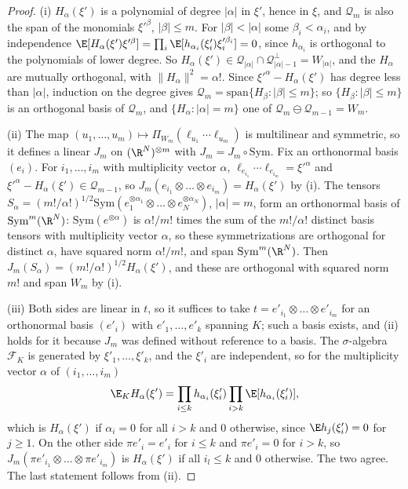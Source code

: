\begin{proof}
(i) $H_\alpha(\xi')$ is a polynomial of degree $\lvert\alpha\rvert$ in
$\xi'$, hence in $\xi$, and $\mathcal Q_m$ is also the span of the monomials
$\xi'^\beta$, $\lvert\beta\rvert\le m$. For $\lvert\beta\rvert<\lvert\alpha
\rvert$ some $\beta_i<\alpha_i$, and by independence $\E[H_\alpha(\xi')
\xi'^\beta]=\prod_i\E[h_{\alpha_i}(\xi'_i)\xi_i'^{\beta_i}]=0$, since
$h_{\alpha_i}$ is orthogonal to the polynomials of lower degree. So
$H_\alpha(\xi')\in\mathcal Q_{\lvert\alpha\rvert}\cap\mathcal Q_{\lvert
\alpha\rvert-1}^\perp=W_{\lvert\alpha\rvert}$, and the $H_\alpha$ are
mutually orthogonal, with $\lVert H_\alpha\rVert^2=\alpha!$. Since
$\xi'^\alpha-H_\alpha(\xi')$ has degree less than $\lvert\alpha\rvert$,
induction on the degree gives $\mathcal Q_m=\mathrm{span}\{H_\beta:\lvert
\beta\rvert\le m\}$; so $\{H_\beta:\lvert\beta\rvert\le m\}$ is an orthogonal
basis of $\mathcal Q_m$, and $\{H_\alpha:\lvert\alpha\rvert=m\}$ one of
$\mathcal Q_m\ominus\mathcal Q_{m-1}=W_m$.

(ii) The map $(u_1,\dots,u_m)\mapsto\Pi_{W_m}(\ell_{u_1}\cdots\ell_{u_m})$ is
multilinear and symmetric, so it defines a linear $J_m$ on $(\R^N)^{\otimes
m}$ with $J_m=J_m\circ\mathrm{Sym}$. Fix an orthonormal basis $(e_i)$. For
$i_1,\dots,i_m$ with multiplicity vector $\alpha$, $\ell_{e_{i_1}}\cdots
\ell_{e_{i_m}}=\xi'^\alpha$ and $\xi'^\alpha-H_\alpha(\xi')\in\mathcal
Q_{m-1}$, so $J_m(e_{i_1}\otimes\dots\otimes e_{i_m})=H_\alpha(\xi')$ by
(i). The tensors $S_\alpha=(m!/\alpha!)^{1/2}\mathrm{Sym}(e_1^{\otimes
\alpha_1}\otimes\dots\otimes e_N^{\otimes\alpha_N})$, $\lvert\alpha\rvert=
m$, form an orthonormal basis of $\mathrm{Sym}^m(\R^N)$: $\mathrm{Sym}
(e^{\otimes\alpha})$ is $\alpha!/m!$ times the sum of the $m!/\alpha!$
distinct basis tensors with multiplicity vector $\alpha$, so these
symmetrizations are orthogonal for distinct $\alpha$, have squared norm
$\alpha!/m!$, and span $\mathrm{Sym}^m(\R^N)$. Then $J_m(S_\alpha)=(m!/
\alpha!)^{1/2}H_\alpha(\xi')$, and these are orthogonal with squared norm
$m!$ and span $W_m$ by (i).

(iii) Both sides are linear in $t$, so it suffices to take $t=e'_{i_1}
\otimes\dots\otimes e'_{i_m}$ for an orthonormal basis $(e'_i)$ with
$e'_1,\dots,e'_k$ spanning $K$; such a basis exists, and (ii) holds for it
because $J_m$ was defined without reference to a basis. The $\sigma$-algebra
$\mathcal F_K$ is generated by $\xi'_1,\dots,\xi'_k$, and the $\xi'_i$ are
independent, so for the multiplicity vector $\alpha$ of $(i_1,\dots,i_m)$
\[
\E_KH_\alpha(\xi')=\prod_{i\le k}h_{\alpha_i}(\xi'_i)\prod_{i>k}\E[h_{
\alpha_i}(\xi'_i)],
\]
which is $H_\alpha(\xi')$ if $\alpha_i=0$ for all $i>k$ and $0$ otherwise,
since $\E h_j(\xi'_i)=0$ for $j\ge1$. On the other side $\pi e'_i=e'_i$ for
$i\le k$ and $\pi e'_i=0$ for $i>k$, so $J_m(\pi e'_{i_1}\otimes\dots\otimes
\pi e'_{i_m})$ is $H_\alpha(\xi')$ if all $i_l\le k$ and $0$ otherwise. The
two agree. The last statement follows from (ii).
\end{proof}

